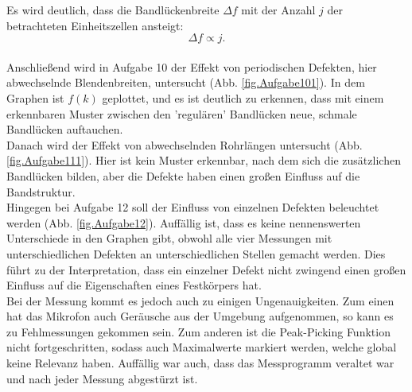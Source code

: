 Es wird deutlich, dass die Bandlückenbreite $\Delta f$ mit der Anzahl $j$ der betrachteten Einheitszellen ansteigt:
\begin{equation*}
  \Delta f \propto j.
\end{equation*}
\\Anschließend wird in Aufgabe 10 der Effekt von periodischen Defekten, hier abwechselnde Blendenbreiten, untersucht (Abb. \ref{fig.Aufgabe101}).
In dem Graphen ist $f(k)$ geplottet, und es ist deutlich zu erkennen, dass mit einem erkennbaren Muster zwischen den 'regulären' Bandlücken neue, schmale Bandlücken auftauchen.
\\Danach wird der Effekt von abwechselnden Rohrlängen untersucht (Abb. \ref{fig.Aufgabe111}).
Hier ist kein Muster erkennbar, nach dem sich die zusätzlichen Bandlücken bilden, aber die Defekte haben einen großen Einfluss auf die Bandstruktur.
\\Hingegen bei Aufgabe 12 soll der Einfluss von einzelnen Defekten beleuchtet werden (Abb. \ref{fig.Aufgabe12}).
Auffällig ist, dass es keine nennenswerten Unterschiede in den Graphen gibt, obwohl alle vier Messungen mit unterschiedlichen Defekten an unterschiedlichen Stellen gemacht werden.
Dies führt zu der Interpretation, dass ein einzelner Defekt nicht zwingend einen großen Einfluss auf die Eigenschaften eines Festkörpers hat.
\\Bei der Messung kommt es jedoch auch zu einigen Ungenauigkeiten.
Zum einen hat das Mikrofon auch Geräusche aus der Umgebung aufgenommen, so kann es zu Fehlmessungen gekommen sein.
Zum anderen ist die Peak-Picking Funktion nicht fortgeschritten, sodass auch Maximalwerte markiert werden, welche global keine Relevanz haben.
Auffällig war auch, dass das Messprogramm veraltet war und nach jeder Messung abgestürzt ist.
